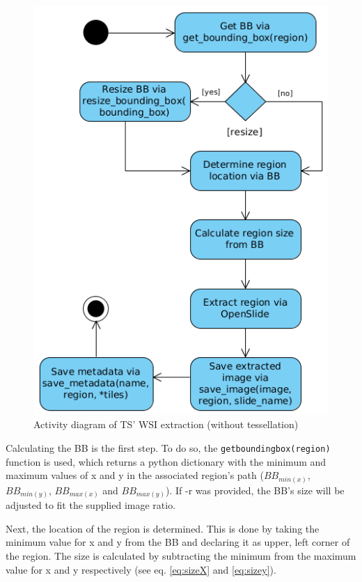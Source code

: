 \begin{figure}[H]
	\begin{center}
		\includegraphics[scale=0.45]{img/ts_wsi_uml.png}
		\caption{Activity diagram of TS' WSI extraction (without tessellation)}
		\label{fig5_tsWsiUml}
	\end{center}
\end{figure}

Calculating the BB is the first step. To do so, the \texttt{get{\textunderscore}bounding{\textunderscore}box(region)} function is used, which returns a python dictionary with the minimum and maximum values of x and y in the associated region's path ($BB_{min(x)}$, $BB_{min(y)}$, $BB_{max(x)}$ and $BB_{max(y)}$). If -r was provided, the BB's size will be adjusted to fit the supplied image ratio.

Next, the location of the region is determined. This is done by taking the minimum value for x and y from the BB and declaring it as upper, left corner of the region. The size is calculated by subtracting the minimum from the maximum value for x and y respectively (see eq. \ref{eq:sizeX} and \ref{eq:sizey}).

